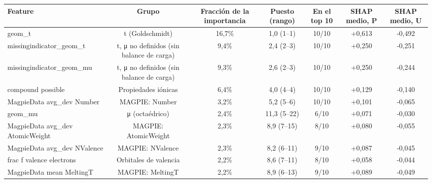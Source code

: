 \begin{tabular}{lcccccc}
\toprule
Feature & Grupo & Fracción de la importancia & Puesto (rango) & En el top 10 & SHAP medio, P & SHAP medio, U \\
\midrule
geom\_t & t (Goldschmidt) & 16,7\% & 1,0 (1--1) & 10/10 & +0,613 & -0,492 \\
missingindicator\_geom\_t & t, μ no definidos (sin balance de carga) & 9,4\% & 2,4 (2--3) & 10/10 & +0,250 & -0,251 \\
missingindicator\_geom\_mu & t, μ no definidos (sin balance de carga) & 9,3\% & 2,6 (2--3) & 10/10 & +0,250 & -0,244 \\
compound possible & Propiedades iónicas & 6,4\% & 4,0 (4--4) & 10/10 & +0,129 & -0,140 \\
MagpieData avg\_dev Number & MAGPIE: Number & 3,2\% & 5,2 (5--6) & 10/10 & +0,101 & -0,065 \\
geom\_mu & μ (octaédrico) & 2,4\% & 11,3 (5--22) & 6/10 & +0,071 & -0,030 \\
MagpieData avg\_dev AtomicWeight & MAGPIE: AtomicWeight & 2,3\% & 8,9 (7--15) & 8/10 & +0,080 & -0,055 \\
MagpieData avg\_dev NValence & MAGPIE: NValence & 2,3\% & 8,2 (6--11) & 9/10 & +0,087 & -0,045 \\
frac f valence electrons & Orbitales de valencia & 2,2\% & 8,6 (7--11) & 8/10 & +0,058 & -0,044 \\
MagpieData mean MeltingT & MAGPIE: MeltingT & 2,2\% & 8,9 (6--13) & 9/10 & +0,089 & -0,049 \\
\bottomrule
\end{tabular}
